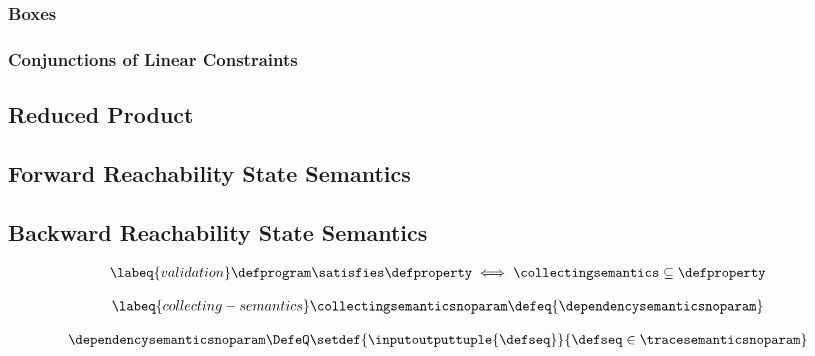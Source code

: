\subsubsection*{Boxes}

\subsubsection*{Conjunctions of Linear Constraints}

\subsection{Reduced Product}

\subsection{Forward Reachability State Semantics}

\subsection{Backward Reachability State Semantics}

\begin{definition}[Validation]
  \begin{align}
    \labeq{validation}
    \defprogram \satisfies \defproperty \iff \collectingsemantics \subseteq \defproperty
  \end{align}
\end{definition}

\begin{definition}
  \begin{align}
    \labeq{collecting-semantics}
    \collectingsemanticsnoparam \defeq \{ \dependencysemanticsnoparam \}
  \end{align}
\end{definition}

\begin{definition}
  \begin{align*}
    \dependencysemanticsnoparam \DefeQ \setdef{\inputoutputtuple{\defseq}}{\defseq\in\tracesemanticsnoparam}
  \end{align*}
\end{definition}

